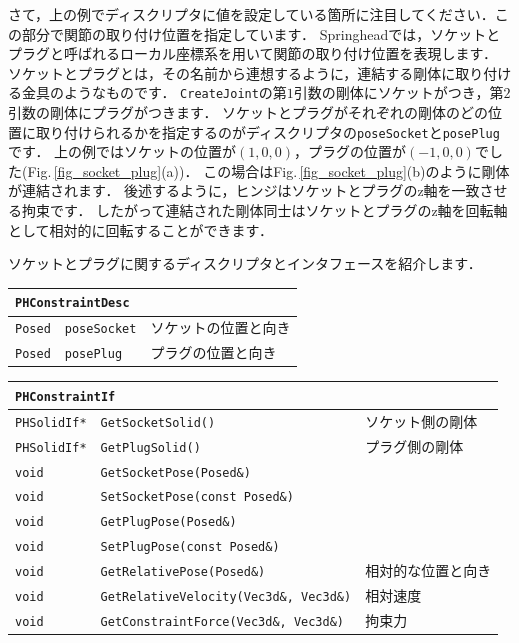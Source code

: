 \KLUDGE さて，上の例でディスクリプタに値を設定している箇所に注目してください．この部分で関節の取り付け位置を指定しています．
Springheadでは，ソケットとプラグと呼ばれるローカル座標系を用いて関節の取り付け位置を表現します．
\KLUDGE ソケットとプラグとは，その名前から連想するように，連結する剛体に取り付ける金具のようなものです．
\texttt{CreateJoint}の第$1$引数の剛体にソケットがつき，第$2$引数の剛体にプラグがつきます．
\KLUDGE ソケットとプラグがそれぞれの剛体のどの位置に取り付けられるかを指定するのがディスクリプタの\texttt{poseSocket}と\texttt{posePlug}です．
\KLUDGE 上の例ではソケットの位置が$(1,0,0)$，プラグの位置が$(-1,0,0)$でした(Fig.\,\ref{fig_socket_plug}(a))．
\KLUDGE この場合はFig.\,\ref{fig_socket_plug}(b)のように剛体が連結されます．
\KLUDGE 後述するように，ヒンジはソケットとプラグのz軸を一致させる拘束です．
\KLUDGE したがって連結された剛体同士はソケットとプラグのz軸を回転軸として相対的に回転することができます．

\KLUDGE ソケットとプラグに関するディスクリプタとインタフェースを紹介します．

\begin{center}
\begin{tabular}{p{.15\hsize}p{.35\hsize}p{.40\hsize}}
\multicolumn{3}{l}{\texttt{PHConstraintDesc}}					\\ \midrule
\texttt{Posed}	&	\texttt{poseSocket}	& ソケットの位置と向き	\\
\texttt{Posed}	&	\texttt{posePlug}	& プラグの位置と向き	\\
\end{tabular}
\end{center}

\begin{center}
\begin{tabular}{p{.15\hsize}p{.50\hsize}p{.25\hsize}}
\multicolumn{3}{l}{\texttt{PHConstraintIf}}								\\ \midrule
\texttt{PHSolidIf*}	& \texttt{GetSocketSolid()}							& ソケット側の剛体 \\
\texttt{PHSolidIf*} & \texttt{GetPlugSolid()}							& プラグ側の剛体 \\
\texttt{void} 		& \texttt{GetSocketPose(Posed\&)}					& \\
\texttt{void} 		& \texttt{SetSocketPose(const Posed\&)}				& \\
\texttt{void} 		& \texttt{GetPlugPose(Posed\&)}						& \\
\texttt{void} 		& \texttt{SetPlugPose(const Posed\&)}				& \\
\texttt{void} 		& \texttt{GetRelativePose(Posed\&)}					& 相対的な位置と向き \\
\texttt{void} 		& \texttt{GetRelativeVelocity(Vec3d\&, Vec3d\&)}	& 相対速度 \\
\texttt{void} 		& \texttt{GetConstraintForce(Vec3d\&, Vec3d\&)}		& 拘束力 \\
\end{tabular}
\end{center}
\KLUDGE %
\KLUDGE %

